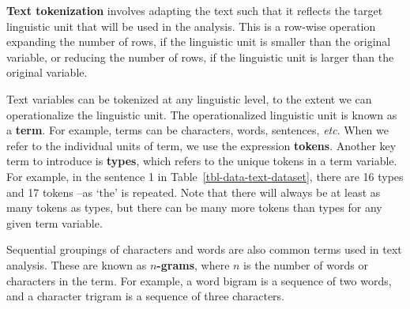 \documentclass[
  letterpaper,
]{latex/krantz}
\theoremstyle{definition}
\theoremstyle{remark}
\begin{document}
\textbf{Text tokenization} involves adapting the text such that it
reflects the target linguistic unit that will be used in the analysis.
This is a row-wise operation expanding the number of rows, if the
linguistic unit is smaller than the original variable, or reducing the
number of rows, if the linguistic unit is larger than the original
variable.

Text variables can be tokenized at any linguistic level, to the extent
we can operationalize the linguistic unit. The operationalized
linguistic unit is known as a \textbf{term}. For example, terms can be
characters, words, sentences, \emph{etc}. When we refer to the
individual units of term, we use the expression \textbf{tokens}. Another
key term to introduce is \textbf{types}, which refers to the unique
tokens in a term variable. For example, in the sentence 1 in
Table~\ref{tbl-data-text-dataset}, there are 16 types and 17 tokens --as
`the' is repeated. Note that there will always be at least as many
tokens as types, but there can be many more tokens than types for any
given term variable.

Sequential groupings of characters and words are also common terms used
in text analysis. These are known as \textbf{\(n\)-grams}, where \(n\)
is the number of words or characters in the term. For example, a word
bigram is a sequence of two words, and a character trigram is a sequence
of three characters.
\end{document}
